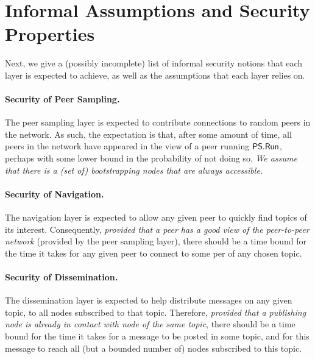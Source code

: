 \section{Informal Assumptions and Security Properties}
\label{sec:informal-assumption-security}

Next, we give a (possibly incomplete) list of informal security notions that each layer is expected to achieve, as well as the assumptions that each layer relies on.

\paragraph{Security of Peer Sampling.} The peer sampling layer is expected to contribute connections to random peers in the network. As such, the expectation is that, after some amount of time, all peers in the network have appeared in the view of a peer running $\mathsf{PS}.\mathsf{Run}$, perhaps with some lower bound in the probability of not doing so.
\emph{We assume that there is a (set of) bootstrapping nodes that are always accessible.}

\paragraph{Security of Navigation.} The navigation layer is expected to allow any given peer to quickly find topics of its interest. Consequently, \emph{provided that a peer has a good view of the peer-to-peer network} (provided by the peer sampling layer), there should be a time bound for the time it takes for any given peer to connect to some per of any chosen topic.

\paragraph{Security of Dissemination.} The dissemination layer is expected to help distribute messages on any given topic, to all nodes subscribed to that topic. Therefore, \emph{provided that a publishing node is already in contact with node of the same topic}, there should be a time bound for the time it takes for a message to be posted in some topic, and for this message to reach all (but a bounded number of) nodes subscribed to this topic.